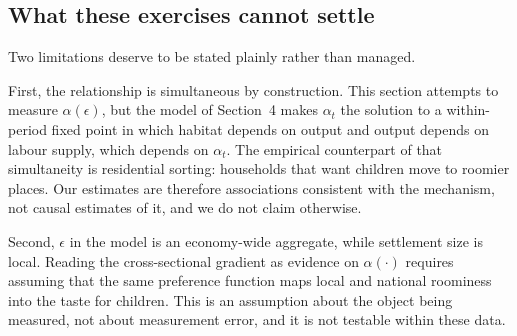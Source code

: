 \documentclass[11pt]{article}
\begin{document}
\subsection{What these exercises cannot settle}
\label{sub:caveats}

Two limitations deserve to be stated plainly rather than managed.

First, the relationship is simultaneous by construction. This section attempts to
measure $\alpha(\epsilon)$, but the model of Section~4 makes $\alpha_t$ the solution to a
within-period fixed point in which habitat depends on output and output depends on labour supply,
which depends on $\alpha_t$. The empirical counterpart of that simultaneity is residential sorting:
households that want children move to roomier places. Our estimates are therefore associations
consistent with the mechanism, not causal estimates of it, and we do not claim otherwise.

Second, $\epsilon$ in the model is an economy-wide aggregate, while settlement size is local.
Reading the cross-sectional gradient as evidence on $\alpha(\cdot)$ requires assuming that the same
preference function maps local and national roominess into the taste for children. This is an
assumption about the object being measured, not about measurement error, and it is not testable
within these data.

\singlespacing
 
 	
\end{document}
